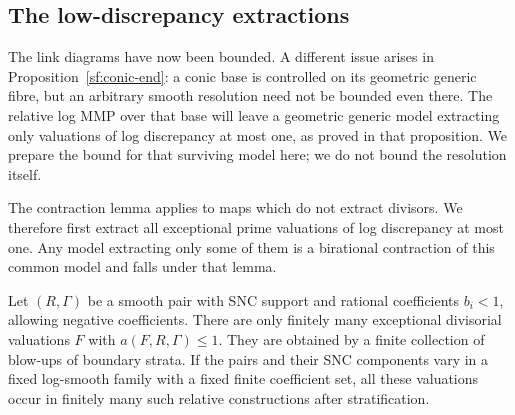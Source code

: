 \subsection{The low-discrepancy extractions}

The link diagrams have now been bounded. A different issue arises in
Proposition~\ref{sf:conic-end}: a conic base is controlled on its geometric
generic fibre, but an arbitrary smooth resolution need not be bounded
even there. The relative log MMP over that base will leave a geometric
generic model extracting only valuations of log discrepancy at most one,
as proved in that proposition. We prepare the bound for that surviving
model here; we do not bound the resolution itself.

The contraction lemma applies to maps which do not extract divisors.
We therefore first extract all exceptional prime valuations of log
discrepancy at most one. Any model extracting only some of them is a
birational contraction of this common model and falls under that lemma.

\begin{lemma}
\label{bd:snc-places}
Let $(R,\Gamma)$ be a smooth pair with SNC support and rational
coefficients $b_i<1$, allowing negative coefficients.  There are
only finitely many exceptional divisorial valuations $F$ with
$a(F,R,\Gamma)\leq1$.  They are obtained by a finite collection
of blow-ups of boundary strata.  If the pairs and their SNC
components vary in a fixed log-smooth family with a fixed finite
coefficient set, all these valuations occur in finitely many such
relative constructions after stratification.
\end{lemma}

